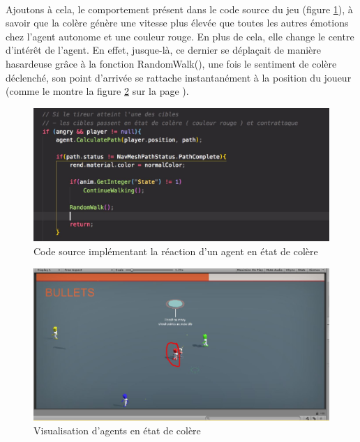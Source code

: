 ~\par
Ajoutons à cela, le comportement présent dans le code source du jeu (figure \ref{fig:derfon}), à savoir que la colère génère une vitesse plus élevée que toutes les autres émotions chez l’agent autonome et une couleur rouge. En plus de cela, elle change le centre d'intérêt de l'agent. En effet, jusque-là, ce dernier se déplaçait de manière hasardeuse grâce à la fonction RandomWalk(), une fois le sentiment de colère déclenché, son point d’arrivée se rattache instantanément à la position du joueur (comme le montre la figure \ref{fig:bichi4} sur la page \pageref{fig:bichi4}).



\begin{figure}[th]
\centering
\includegraphics{Figures/derfon.JPG}
\decoRule
\caption[Code source implémentant la réaction d'un agent en état de colère]{Code source implémentant la réaction d'un agent en état de colère}
\label{fig:derfon}
\end{figure}



\begin{figure}[th]
\centering
\includegraphics{Figures/rouge.JPG}
\decoRule
\caption[Visualisation d'agents en état de colère]{Visualisation d'agents en état de colère}
\label{fig:bichi4}
\end{figure}

